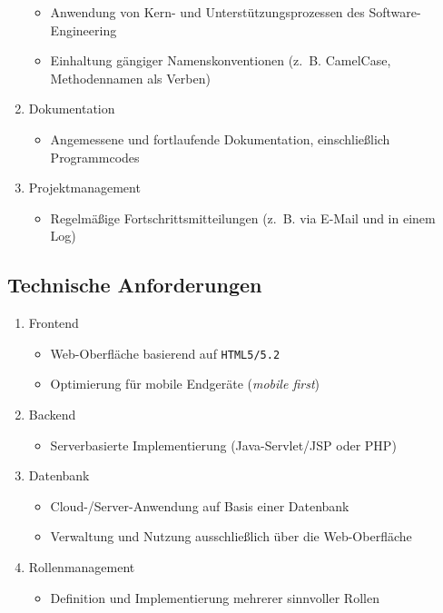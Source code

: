 \documentclass[%
	ngerman,
	12pt,
	a4paper,
	oneside
]{scrbook}
\begin{document}
\begin{enumerate}
\begin{itemize}
			\item Anwendung von Kern- und Unterstützungsprozessen des Software-Engineering
			\item Einhaltung gängiger Namenskonventionen (z.~B. CamelCase, Methodennamen als Verben)
		\end{itemize}
		\item Dokumentation
		\begin{itemize}
			\item Angemessene und fortlaufende Dokumentation, einschließlich Programmcodes
		\end{itemize}
		\item Projektmanagement
		\begin{itemize}
			\item Regelmäßige Fortschrittsmitteilungen (z.~B. via E-Mail und in einem Log)
		\end{itemize}
	\end{enumerate}
	\subsection{Technische Anforderungen}
	\begin{enumerate}
		\item Frontend
		\begin{itemize}
			\item Web-Oberfläche basierend auf \texttt{HTML5/5.2}
			\item Optimierung für mobile Endgeräte (\textit{mobile first})
		\end{itemize}
		\item Backend
		\begin{itemize}
			\item Serverbasierte Implementierung (Java-Servlet/JSP oder PHP)
		\end{itemize}
		\item Datenbank
		\begin{itemize}
			\item Cloud-/Server-Anwendung auf Basis einer Datenbank
			\item Verwaltung und Nutzung ausschließlich über die Web-Oberfläche
		\end{itemize}
		\item Rollenmanagement
		\begin{itemize}
			\item Definition und Implementierung mehrerer sinnvoller Rollen
		\end{itemize}
	\end{enumerate}
\end{document}
